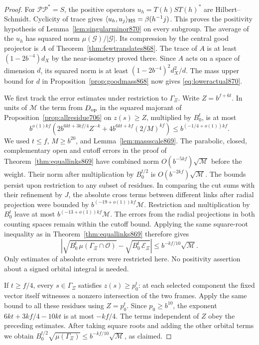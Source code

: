 \documentclass[a4paper,11pt]{article}
\theoremstyle{definition}
\theoremstyle{remark}
\numberwithin{equation}{section}
\begin{document}
\begin{proof}
For \(\mathcal P\mathcal P^*=S\), the positive operators
\(u_h=T(h)ST(h)^*\) are Hilbert--Schmidt. Cyclicity of trace
gives \(\langle u_h,u_j\rangle_{\rm HS}=\beta(h^{-1}j)\).
This proves the positivity hypothesis of
Lemma~\ref{lem:singularminor870} on every subgroup.
The average of the \(u_h\) has squared norm
\(\mu(\mathcal G)/|\mathcal G|\). Its compression by the
central good projector is \(A\) of Theorem~\ref{thm:fewtranslates868}.
The trace of \(A\) is at least \((1-2b^{-4})d_X\) by the
near-isometry proved there. Since \(A\) acts on a space of
dimension \(d\), its squared norm is at least
\((1-2b^{-4})^2d_X^2/d\). The mass upper bound for \(d\) in
Proposition~\ref{prop:goodmass868} now gives
\eqref{eq:loweractual870}.

We first track the error estimates under restriction to
\(\Gamma_\Xi\). Write \(Z=b^{f+6t}\). In units of \(\mathcal M\)
the term from \(D_{\rm op}\) in the squared majorant of
Proposition~\ref{prop:allresidue706} on \(z(s)\ge Z\), multiplied
by \(B_0^t\), is at most
\[
 b^{o(1)kf}\left(2b^{6kt+3kf/4}Z^{-k}
                        +4b^{6kt+kf}(2/M)^{kf}\right)
       \le b^{(-1/4+o(1))kf}.
\]
We used \(t\le f\), \(M\ge b^{20}\), and
Lemma~\ref{lem:massscale869}. The parabolic, closed, complementary
open and cutoff errors in the proof of Theorem~\ref{thm:equallinks869}
have combined norm \(O(b^{-5kf})\sqrt{\mathcal M}\) before the
weight. Their norm after multiplication by \(B_0^{t/2}\) is
\(O(b^{-2kf})\sqrt{\mathcal M}\). The bounds persist upon
restriction to any subset of residues. In comparing the cut sums
with their refinement by \(J\), the absolute cross terms between
different links after radial projection were bounded by
\(b^{(-19+o(1))kf}\mathcal M\). Restriction and multiplication
by \(B_0^t\) leave at most \(b^{(-13+o(1))kf}\mathcal M\).
The errors from the radial projections in both counting spaces
remain within the cutoff bound. Applying the same square-root
inequality as in Theorem~\ref{thm:equallinks869} therefore gives
\[
 \left|\sqrt{B_0^t\,\mu(\Gamma_\Xi\cap\mathcal O)}
            -\sqrt{B_0^t\,\mathcal E_\Xi}\right|
       \le b^{-kf/10}\sqrt{\mathcal M}.
\]
Only estimates of absolute errors were restricted here. No
positivity assertion about a signed orbital integral is needed.

If \(t\ge f/4\), every \(s\in\Gamma_\Xi\) satisfies
\(z(s)\ge p_0^t\): at each selected component the fixed vector
itself witnesses a nonzero intersection of the two frames.
Apply the same bound to all these residues using \(Z=p_0^t\).
Since \(p_0\ge b^{10}\), the exponent \(6kt+3kf/4-10kt\)
is at most \(-kf/4\). The terms independent of \(Z\) obey
the preceding estimates. After taking square roots and adding
the other orbital terms we obtain
\(B_0^{t/2}\sqrt{\mu(\Gamma_\Xi)}\le
 b^{-kf/10}\sqrt{\mathcal M}\), as claimed.


\end{proof}
\end{document}
